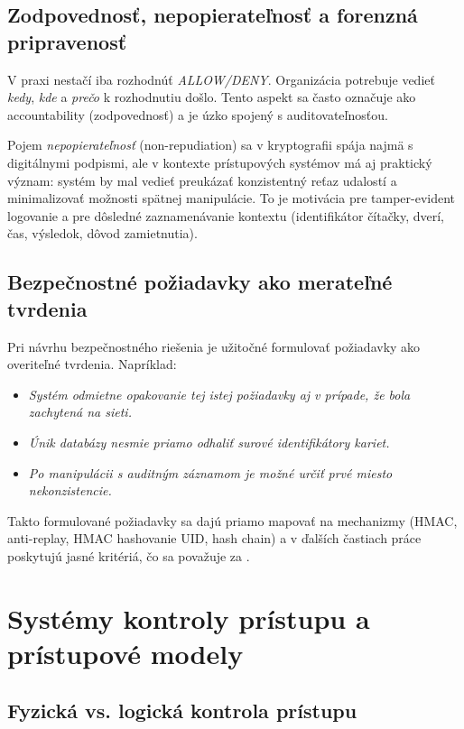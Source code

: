 \documentclass[journal,a4paper,onecolumn]{IEEEtran}
\begin{document}
\subsection{Zodpovednosť, nepopierateľnosť a forenzná pripravenosť}

V praxi nestačí iba rozhodnúť \emph{ALLOW/DENY}. Organizácia potrebuje vedieť \emph{kedy}, \emph{kde} a \emph{prečo} k rozhodnutiu došlo. Tento aspekt sa často označuje ako accountability (zodpovednosť) a je úzko spojený s auditovateľnosťou.

Pojem \emph{nepopierateľnosť} (non-repudiation) sa v kryptografii spája najmä s digitálnymi podpismi, ale v kontexte prístupových systémov má aj praktický význam: systém by mal vedieť preukázať konzistentný reťaz udalostí a minimalizovať možnosti spätnej manipulácie. To je motivácia pre tamper-evident logovanie a pre dôsledné zaznamenávanie kontextu (identifikátor čítačky, dverí, čas, výsledok, dôvod zamietnutia).

\subsection{Bezpečnostné požiadavky ako merateľné tvrdenia}

Pri návrhu bezpečnostného riešenia je užitočné formulovať požiadavky ako overiteľné tvrdenia. Napríklad:

\begin{itemize}[leftmargin=*,itemsep=2pt]
  \item \emph{Systém odmietne opakovanie tej istej požiadavky aj v prípade, že bola zachytená na sieti.}
  \item \emph{Únik databázy nesmie priamo odhaliť surové identifikátory kariet.}
  \item \emph{Po manipulácii s auditným záznamom je možné určiť prvé miesto nekonzistencie.}
\end{itemize}

Takto formulované požiadavky sa dajú priamo mapovať na mechanizmy (HMAC, anti-replay, HMAC hashovanie UID, hash chain) a v ďalších častiach práce poskytujú jasné kritériá, čo sa považuje za .
\section{Systémy kontroly prístupu a prístupové modely}

\subsection{Fyzická vs. logická kontrola prístupu}
\end{document}
